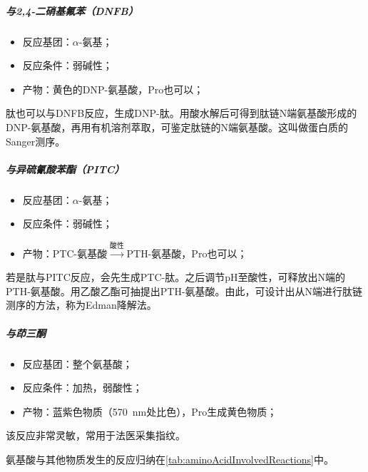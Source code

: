\subparagraph{与2,4-二硝基氟苯（DNFB）}

\begin{itemize}
	\item 反应基团：$\alpha$-氨基；
	\item 反应条件：弱碱性；
	\item 产物：黄色的DNP-氨基酸，Pro也可以；
\end{itemize}

肽也可以与DNFB反应，生成DNP-肽。用酸水解后可得到肽链N端氨基酸形成的DNP-氨基酸，再用有机溶剂萃取，可鉴定肽链的N端氨基酸。这叫做蛋白质的Sanger测序。

\subparagraph{与异硫氰酸苯酯（PITC）}

\begin{itemize}
	\item 反应基团：$\alpha$-氨基；
	\item 反应条件：弱碱性；
	\item 产物：PTC-氨基酸$\xrightarrow{\text{酸性}}$PTH-氨基酸，Pro也可以；
\end{itemize}

若是肽与PITC反应，会先生成PTC-肽。之后调节pH至酸性，可释放出N端的PTH-氨基酸。用乙酸乙酯可抽提出PTH-氨基酸。由此，可设计出从N端进行肽链测序的方法，称为Edman降解法。

\subparagraph{与茚三酮}

\begin{itemize}
	\item 反应基团：整个氨基酸；
	\item 反应条件：加热，弱酸性；
	\item 产物：蓝紫色物质（\SI{570}{\nm}处比色），Pro生成黄色物质；
\end{itemize}

该反应非常灵敏，常用于法医采集指纹。

氨基酸与其他物质发生的反应归纳在\autoref{tab:aminoAcidInvolvedReactions}中。

